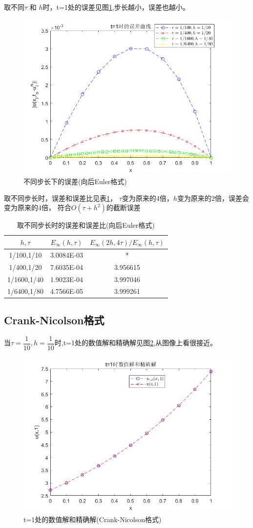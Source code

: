 \documentclass[withoutpreface,bwprint]{cumcmthesis} %
\begin{document}
取不同$\tau$ 和 $h$时，t=1处的误差见图\ref{fig:f2},步长越小，误差也越小。
\begin{figure}
	\centering
	\includegraphics[width=0.7\linewidth]{figures/f2}
	\caption{不同步长下的误差(向后Euler格式)}
	\label{fig:f2}
\end{figure}



取不同步长时，误差和误差比见表\ref{tab:2}， $\tau$变为原来的4倍，$h$变为原来的2倍，误差会变为原来的4倍，
符合$O(\tau+h^2)$的截断误差

\begin{table}[htbp]
	\centering
	\caption{取不同步长时的误差和误差比(向后Euler格式)}
	\begin{tabular}{ccc}
		\toprule[1.5pt]
		$h,\tau$   & $E_{\infty}(h,\tau)$ & $E_{\infty}(2h,4\tau)/E_{\infty}(h,\tau)$ \\
		\midrule[1pt]
		1/100,1/10 & 3.0084E-03 & * \\
		1/400,1/20 & 7.6035E-04 & 3.956615  \\
		1/1600,1/40 & 1.9023E-04 & 3.997046  \\
		1/6400,1/80 & 4.7566E-05 & 3.999261  \\
		\bottomrule[1.5pt]
	\end{tabular}%
	\label{tab:2}%
\end{table}%

\subsection{Crank-Nicolson格式}
当$\tau=\dfrac{1}{10},h=\dfrac{1}{10}$时,t=1处的数值解和精确解见图\ref{fig:f3},从图像上看很接近。
\begin{figure}
	\centering
	\includegraphics[width=0.7\linewidth]{figures/f3}
	\caption{t=1处的数值解和精确解(Crank-Nicolson格式)}
	\label{fig:f3}
\end{figure}
\end{document}
